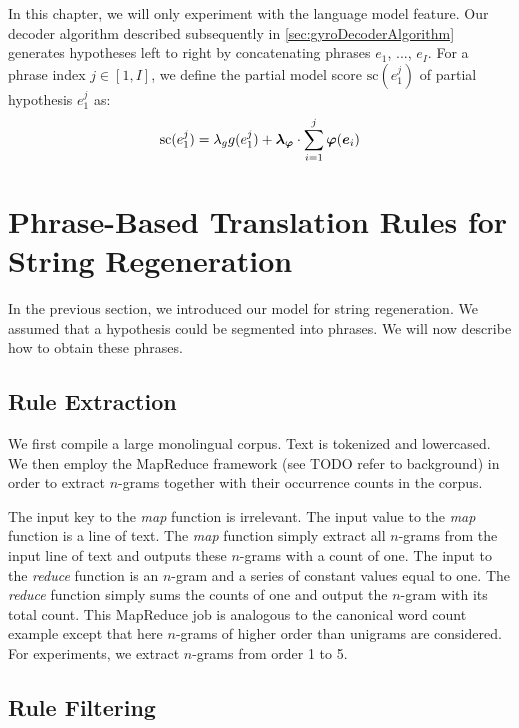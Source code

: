 %
In this chapter, we will only experiment with the language model feature.
Our decoder algorithm described subsequently in
\autoref{sec:gyroDecoderAlgorithm} generates hypotheses left to right
by concatenating phrases $e_1$, ..., $e_I$. For a phrase index $j \in [1, I]$,
we define the partial model score $\text{sc}(e_1^j)$ of partial hypothesis $e_1^j$ as:
%
\begin{equation}
  \text{sc}(e_1^j) = \lambda_g g(e_1^j) + \bm{\lambda_{\varphi}} \cdot \sum_{i = 1}^j \bm{\varphi}(\bm{e}_i) \\
\end{equation}

\section{Phrase-Based Translation Rules for String Regeneration}

In the previous section, we introduced our model for string regeneration.
We assumed that a hypothesis could be segmented into phrases. We will
now describe how to obtain these phrases.

\subsection{Rule Extraction}

We first compile a large monolingual corpus. Text is tokenized
and lowercased. We then employ the MapReduce
framework (see TODO refer to background) in order to extract
$n$-grams together with their occurrence counts in the corpus.

The input key to the \emph{map} function is irrelevant.
The input value to the \emph{map} function is a line of text.
The \emph{map} function simply extract all $n$-grams from the
input line of text and outputs these $n$-grams with a count of
one. The input to the \emph{reduce} function is an $n$-gram
and a series of constant values equal to one.
The \emph{reduce} function simply sums the counts of one
and output the $n$-gram with its total count. This MapReduce
job is analogous to the canonical word count example except
that here $n$-grams of higher order than unigrams are considered.
For experiments, we extract $n$-grams from order 1 to 5.

\subsection{Rule Filtering}
\label{sec:ngramRuleFiltering}

